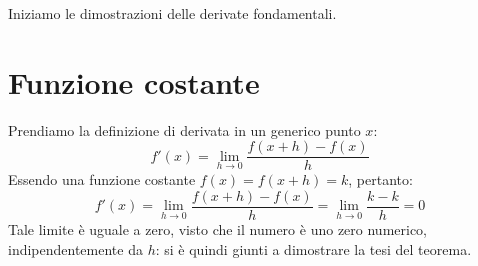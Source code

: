\documentclass{report}
\begin{document}
Iniziamo le dimostrazioni delle derivate fondamentali. \\
\section{Funzione costante}
\begin{myproof} 
Prendiamo la definizione di derivata in un generico punto $x$:
$$f'(x) = \lim_{h \to 0} \frac{f(x+h) - f(x)}{h}$$
Essendo una funzione costante $f(x) = f(x + h) = k$, pertanto:
$$f'(x) = \lim_{h \to 0} \frac{f(x+h) - f(x)}{h} = \lim_{h \to 0}\frac{k - k}{h} = 0$$
Tale limite è uguale a zero, visto che il numero è uno zero numerico, indipendentemente da $h$: si è quindi giunti a dimostrare la tesi del teorema. \\
\end{myproof}
\end{document}
